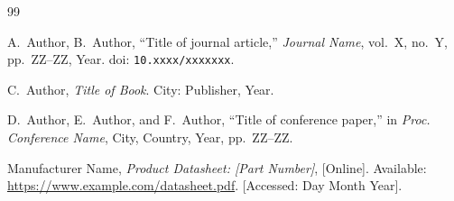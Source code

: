 \documentclass[12pt, a4paper]{report}
\begin{document}
\renewcommand{\bibname}{References}
\begin{thebibliography}{99}

A.~Author, B.~Author,
``Title of journal article,''
\textit{Journal Name}, vol.~X, no.~Y, pp.~ZZ--ZZ, Year.
doi: \texttt{10.xxxx/xxxxxxx}.

C.~Author,
\textit{Title of Book}.
City: Publisher, Year.

D.~Author, E.~Author, and F.~Author,
``Title of conference paper,''
in \textit{Proc. Conference Name}, City, Country, Year, pp.~ZZ--ZZ.

Manufacturer Name,
\textit{Product Datasheet: [Part Number]},
[Online]. Available: \url{https://www.example.com/datasheet.pdf}.
[Accessed: Day Month Year].

\end{thebibliography}
\end{document}
